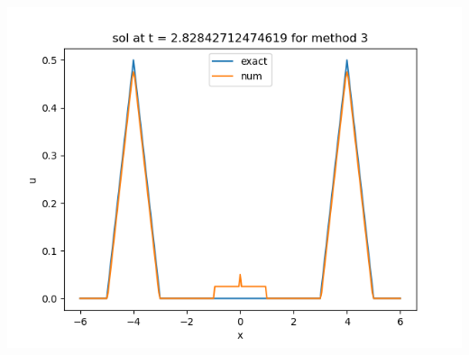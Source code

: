 \documentclass{article}
\begin{document}
\begin{enumerate}[label=(\alph*)]
\begin{center}
	\includegraphics[scale=.4]{hw11 sol n = 80 method 3}
\end{center}
	
\end{enumerate}


	
\end{document}

